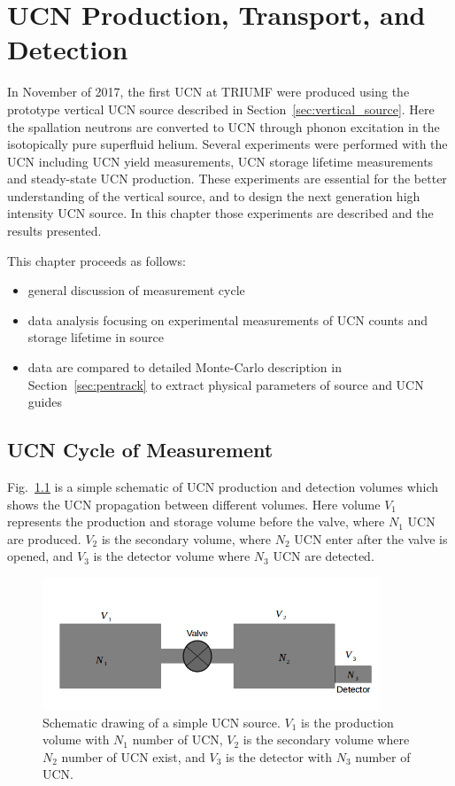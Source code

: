 \chapter{UCN Production, Transport, and
  Detection\label{chap:UCNresult}}

In November of 2017, the first UCN at TRIUMF were produced using the
prototype vertical UCN source described in
Section~\ref{sec:vertical_source}. Here the spallation neutrons are
converted to UCN through phonon excitation in the isotopically pure
superfluid helium. Several experiments were performed with the UCN
including UCN yield measurements, UCN storage lifetime measurements
and steady-state UCN production. These experiments are essential for
the better understanding of the vertical source, and to design the
next generation high intensity UCN source. In this chapter those
experiments are described and the results presented.

This chapter proceeds as follows:
\begin{itemize}
\item general discussion of measurement cycle
\item data analysis focusing on experimental measurements of UCN
  counts and storage lifetime in source
\item data are compared to detailed Monte-Carlo description in
  Section~\ref{sec:pentrack} to extract physical parameters of source
  and UCN guides
\end{itemize}

\section{UCN Cycle of Measurement}
Fig.~\ref{fig:volume_schematic} is a simple schematic of UCN
production and detection volumes which shows the UCN propagation
between different volumes. Here volume $V_1$ represents the production
and storage volume before the valve, where $N_1$ UCN are
produced. $V_2$ is the secondary volume, where $N_2$ UCN enter after
the valve is opened, and $V_3$ is the detector volume where $N_3$ UCN
are detected.


\begin{figure}[h]
  \centering
  \includegraphics[width=0.9\textwidth]{volume_schematic.png}
  \caption[Schematic drawing of a simple UCN source]{Schematic drawing
    of a simple UCN source. $V_1$ is the production volume with $N_1$
    number of UCN, $V_2$ is the secondary volume where $N_2$ number of
    UCN exist, and $V_3$ is the detector with $N_3$ number of UCN. }
  \label{fig:volume_schematic}
\end{figure}

